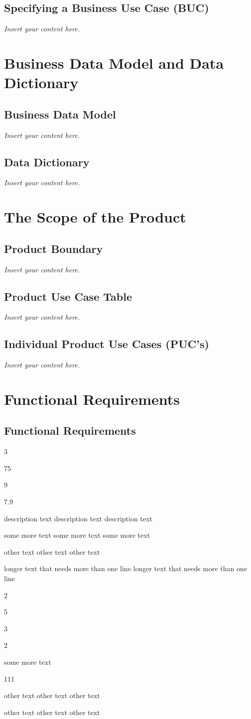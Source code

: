 \documentclass[12pt]{article}
\newenvironment{myreq}[1]{%
\setlist[description]{font=\normalfont\color{darkgray}}%
\begin{tcolorbox}[colframe=black,colback=white, sharp corners, boxrule=1pt]%
\bfseries\color{blue}%
\begin{description}#1}%
{\end{description}\end{tcolorbox}}
\newcommand{\threeinline}[3]{\begin{multicols}{3}#1 #2 #3\end{multicols}}
\newcommand{\twoinline}[2]{\begin{multicols}{2}#1 #2\end{multicols}}
\newcommand{\reqno}{\item[Requirement \#:]}
\newcommand{\reqtype}{\item[Requirement Type:]}
\newcommand{\reqevent}{\item[Event/BUC/PUC \#:]}
\newcommand{\reqdesc}{\item[Description:]}
\newcommand{\reqrat}{\item[Rationale:]}
\newcommand{\reqorig}{\item[Originator:]}
\newcommand{\reqfit}{\item[Fit Criterion:]}
\newcommand{\reqsatis}{\item[Customer Satisfaction:]}
\newcommand{\reqdissat}{\item[Customer Dissatisfaction:]}
\newcommand{\reqdep}{\item[Dependencies:]}
\newcommand{\reqconf}{\item[Conflicts:]}
\newcommand{\reqmater}{\item[Materials:]}
\newcommand{\reqhist}{\item[History:]}
\newcommand{\lips}{\textit{Insert your content here.}}
\begin{document}
\subsection{Specifying a Business Use Case (BUC)}
\lips

\section{Business Data Model and Data Dictionary}
\subsection{Business Data Model}
\lips
\subsection{Data Dictionary}
\lips

\section{The Scope of the Product}
\subsection{Product Boundary}
\lips
\subsection{Product Use Case Table}
\lips
\subsection{Individual Product Use Cases (PUC's)}
\lips

\section{Functional Requirements}
\subsection{Functional Requirements}

\begin{myreq}
  \threeinline
    {\reqno 75}
    {\reqtype 9}
    {\reqevent 7.9}
  \reqdesc description text description text description text 
  \reqrat some more text some more text some more text 
  \reqorig other text other text other text 
  \reqfit longer text that needs more than one line longer text that needs more than one line
  \twoinline
    {\reqsatis 5}
    {\reqdissat 3}
  \twoinline
  {\reqdep some more text}
  {\reqconf 111}
  \reqmater other text other text other text 
  \reqhist other text other text other text 
\end{myreq}
\end{document}
